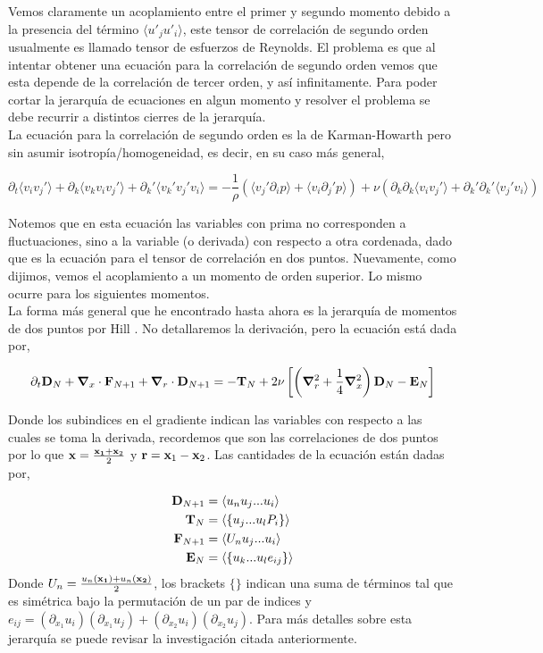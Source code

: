 \documentclass[executivepaper,12pt]{article}
\numberwithin{equation}{section}
\begin{document}
Vemos claramente un acoplamiento entre el primer y segundo momento debido a la presencia del término $\langle u'_ju'_i \rangle$, este tensor de correlación de segundo orden usualmente es llamado tensor de esfuerzos de Reynolds. El problema es que al intentar obtener una ecuación para la correlación de segundo orden vemos que esta depende de la correlación de tercer orden, y así infinitamente. Para poder cortar la jerarquía de ecuaciones en algun momento y resolver el problema se debe recurrir a distintos cierres de la jerarquía.  \\

La ecuación para la correlación de segundo orden es la de Karman-Howarth pero sin asumir isotropía/homogeneidad, es decir, en su caso más general,  

\begin{equation}
	\partial_t\langle v_iv_j' \rangle+\partial_k\langle v_kv_iv_j'\rangle+\partial_k'\langle v_k'v_j'v_i\rangle=-\frac{1}{\rho}(\langle v_j'\partial_i p \rangle+\langle v_i\partial_j' p \rangle )+ \nu (\partial_k\partial_k\langle v_i v_j' \rangle+ \partial_k'\partial_k'\langle v_j'v_i \rangle)
\end{equation}

Notemos que en esta ecuación las variables con prima no corresponden a fluctuaciones, sino a la variable (o derivada) con respecto a otra cordenada, dado que es la ecuación para el tensor de correlación en dos puntos. Nuevamente, como dijimos, vemos el acoplamiento a un momento de orden superior. Lo mismo ocurre para los siguientes momentos. \\
La forma más general que he encontrado hasta ahora es la jerarquía de momentos de dos puntos por Hill \parencite{hill2001}. No detallaremos la derivación, pero la ecuación está dada por,

\begin{equation}
	\partial_t \vb{D}_{N}+\vb{\grad}_x\cdot \vb{F}_{N+1}+\vb{\grad}_r\cdot\vb{D}_{N+1}=-\vb{T}_N+2\nu \left[\left(\grad^2_r+\frac{1}{4}\grad^2_x \right)\vb{D}_N -\vb{E}_N\right]
\end{equation} 

Donde los subindices en el gradiente indican las variables con respecto a las cuales se toma la derivada, recordemos que son las correlaciones de dos puntos por lo que $\vb{x}=\frac{\vb{x_1}+\vb{x}_2}{2}$ y $\vb{r}=\vb{x}_1-\vb{x}_2$. Las cantidades de la ecuación están dadas por,

\begin{align*}
	\vb{D}_{N+1}&=\langle u_nu_j...u_i\rangle\\
	\vb{T}_N&=\langle\left\{u_j...u_lP_i\right\}\rangle\\
	\vb{F}_{N+1}&=\langle U_n u_j...u_i\rangle\\
	\vb{E}_N&=\langle\left\{u_k...u_le_{ij}\right\}\rangle
\end{align*}
Donde $U_n=\frac{u_n(\vb{x_1})+u_n(\vb{x_2})}{2}$, los brackets $\{\}$ indican una suma de términos tal que es simétrica bajo la permutación de un par de indices y $e_{ij}=(\partial_{x_1}u_i)(\partial_{x_1}u_j)+(\partial_{x_2}u_i)(\partial_{x_2}u_j)$. Para más detalles sobre esta jerarquía se puede revisar la investigación citada anteriormente. 
\end{document}
